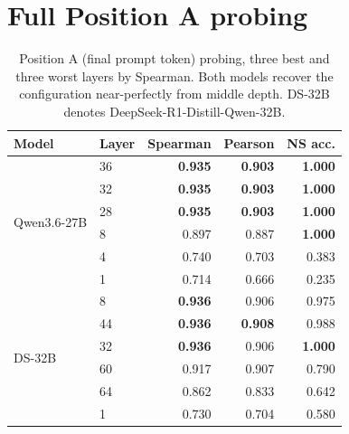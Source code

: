 \documentclass{article} %
\begin{document}
\section{Full Position A probing}
\label{app:posA-full}
\begin{table}[h]
\centering
\caption{Position A (final prompt token) probing, three best and three worst layers by Spearman. Both models recover the configuration near-perfectly from middle depth. DS-32B denotes DeepSeek-R1-Distill-Qwen-32B.}
\label{tab:posA}
\begin{tabular}{llrrr}
\toprule
\textbf{Model} & \textbf{Layer} & \textbf{Spearman} & \textbf{Pearson} & \textbf{NS acc.} \\
\midrule
\multirow{6}{*}{Qwen3.6-27B} & 36 & \textbf{0.935} & \textbf{0.903} & \textbf{1.000} \\
 & 32 & \textbf{0.935} & \textbf{0.903} & \textbf{1.000} \\
 & 28 & \textbf{0.935} & \textbf{0.903} & \textbf{1.000} \\
 & 8  & 0.897 & 0.887 & \textbf{1.000} \\
 & 4  & 0.740 & 0.703 & 0.383 \\
 & 1  & 0.714 & 0.666 & 0.235 \\
\midrule
\multirow{6}{*}{DS-32B} & 8  & \textbf{0.936} & 0.906 & 0.975 \\
 & 44 & \textbf{0.936} & \textbf{0.908} & 0.988 \\
 & 32 & \textbf{0.936} & 0.906 & \textbf{1.000} \\
 & 60 & 0.917 & 0.907 & 0.790 \\
 & 64 & 0.862 & 0.833 & 0.642 \\
 & 1  & 0.730 & 0.704 & 0.580 \\
\bottomrule
\end{tabular}
\end{table}
\end{document}
